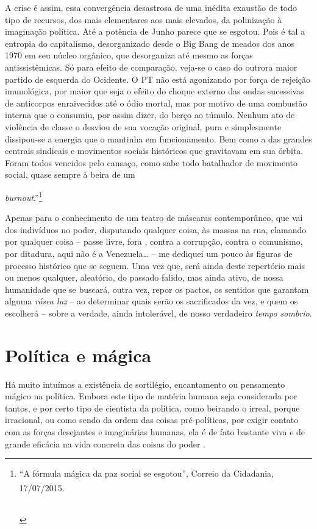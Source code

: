 A crise é assim, essa convergência desastrosa de uma inédita exaustão de
todo tipo de recursos, dos mais elementares aos mais elevados, da
polinização à imaginação política. Até a potência de Junho parece que se
esgotou. Pois é tal a entropia do capitalismo, desorganizado desde o Big
Bang de meados dos anos 1970 em seu núcleo orgânico, que desorganiza até
mesmo as forças antissistêmicas. Só para efeito de comparação, veja-se o
caso do outrora maior partido de esquerda do Ocidente. O PT não está
agonizando por força de rejeição imunológica, por maior que seja o
efeito do choque externo das ondas sucessivas de anticorpos enraivecidos
até o ódio mortal, mas por motivo de uma combustão interna que o
consumiu, por assim dizer, do berço ao túmulo. Nenhum ato de violência
de classe o desviou de sua vocação original, pura e simplesmente
dissipou-se a energia que o mantinha em funcionamento. Bem como a das
grandes centrais sindicais e movimentos sociais históricos que
gravitavam em sua órbita. Foram todos vencidos pelo cansaço, como sabe
todo batalhador de movimento social, quase sempre à beira de
um\emph{burnout}.''\footnote{``A
  fórmula mágica da paz social se esgotou'', Correio da Cidadania,
  17/07/2015.\textsuperscript{\\\\\\}}

Apenas para o conhecimento de um teatro de máscaras contemporâneo, que
vai dos indivíduos no poder, disputando qualquer coisa, às massas na
rua, clamando por qualquer coisa -- passe livre, fora , contra a
corrupção, contra o comunismo, por ditadura, aqui não é a Venezuela…
-- me dediquei um pouco às figuras de processo histórico que se seguem.
Uma vez que, será ainda deste repertório mais ou menos qualquer,
aleatório, do passado falido, mas ainda ativo, de nossa humanidade que
se buscará, outra vez, repor os pactos, os sentidos que garantam alguma
\emph{rósea luz} -- ao determinar quais serão os sacrificados da vez, e
quem os escolherá -- sobre a verdade, ainda intolerável, de nosso
verdadeiro \emph{tempo sombrio}.

  \section{Política e mágica}\label{poluxedtica-e-muxe1gica}

Há muito intuímos a existência de sortilégio, encantamento ou pensamento
mágico na política. Embora este tipo de matéria humana seja considerada
por tantos, e por certo tipo de cientista da política, como beirando o
irreal, porque irracional, ou como sendo da ordem das coisas
pré-políticas, por exigir contato com as forças desejantes e imaginárias
humanas, ela é de fato bastante viva e de grande eficácia na vida
concreta das coisas do poder .

